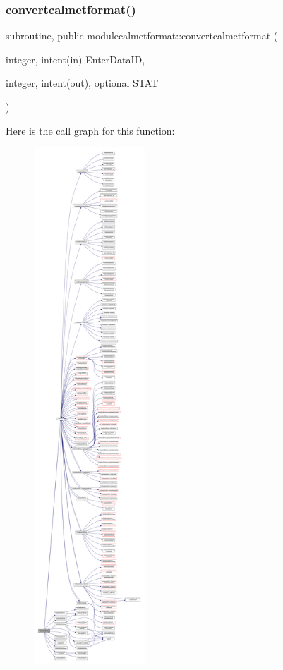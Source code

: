 \subsubsection{\texorpdfstring{convertcalmetformat()}{convertcalmetformat()}}
{\footnotesize\ttfamily subroutine, public modulecalmetformat\+::convertcalmetformat (\begin{DoxyParamCaption}\item[{integer, intent(in)}]{Enter\+Data\+ID,  }\item[{integer, intent(out), optional}]{S\+T\+AT }\end{DoxyParamCaption})}

Here is the call graph for this function\+:\nopagebreak
\begin{figure}[H]
\begin{center}
\leavevmode
\includegraphics[height=550pt]{namespacemodulecalmetformat_a46e7b8dbd76c834dd87aa502fa427ecf_cgraph}
\end{center}
\end{figure}
